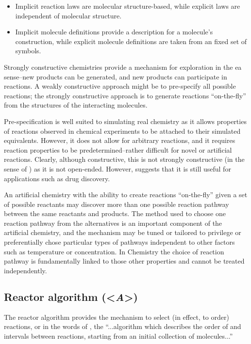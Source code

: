 \begin{itemize}
	\item Implicit reaction laws are molecular structure-based, while explicit laws are independent of molecular structure.
	\item Implicit molecule definitions provide a description for a molecule's construction, while explicit molecule definitions are taken from an fixed set of symbols.
\end{itemize}

Strongly constructive chemistries provide a mechanism for exploration in the \gls{ea} sense--new products can be generated, and new products can participate in reactions. A weakly constructive approach might be to pre-specify all possible reactions; the strongly constructive approach is to generate reactions ``on-the-fly'' from the structures of the interacting molecules. 

Pre-specification is well suited to simulating real chemistry as it allows properties of reactions observed in chemical experiments to be attached to their simulated equivalents. However, it does not allow for arbitrary reactions, and it requires reaction properties to be predetermined--rather difficult for novel or artificial reactions. Clearly, although constructive, this is not strongly constructive (in the sense of \textcite{Fontana1994,Dittrich:2001zr}) as it is not open-ended. However, \textcite{Hartenfeller2011} suggests that it is still useful for applications such as drug discovery.

An artificial chemistry with the ability to create reactions ``on-the-fly'' given a set of possible reactants may discover more than one possible reaction pathway between the same reactants and products. The method used to choose one reaction pathway from the alternatives is an important component of the artificial chemistry, and the mechanism may be tuned or tailored to privilege or preferentially chose particular types of pathways independent to other factors such as temperature or concentration. In Chemistry the choice of reaction pathway is fundamentally linked to those other properties and cannot be treated independently.

\subsection{Reactor algorithm (\textless{}\emph{A}\textgreater{})}

The reactor algorithm provides the mechanism to select (in effect, to order) reactions, or in the words of \textcite[sect. 4.1.3]{Faulconbridge2011}, the ``...algorithm which describes the order of and intervals between reactions, starting from an initial collection of molecules...''

